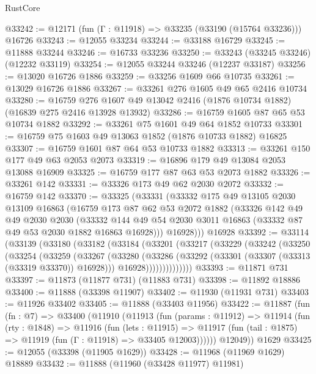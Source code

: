 \begin{lexlean}{RustCore}
\begin{coremodule}
@33242 := @12171 (fun (Γ : @11918) => @33235 (@33190 (@15764 @33236))) @16726
@33243 := @12055 @33234
@33244 := @33188 @16729
@33245 := @11888 @33244
@33246 := @16733 @33236
@33250 := @33243 (@33245 @33246) (@12232 @33119)
@33254 := @12055 @33244 @33246 (@12237 @33187)
@33256 := @13020 @16726 @1886
@33259 := @33256 @1609 @66 @10735
@33261 := @13029 @16726 @1886
@33267 := @33261 @276 @1605 @49 @65 @2416 @10734
@33280 := @16759 @276 @1607 @49 @13042 @2416 (@1876 @10734 @1882) (@16839 @275 @2416 @13928 @13932)
@33286 := @16759 @1605 @87 @65 @53 @10734 @1882
@33292 := @33261 @75 @1601 @49 @64 @1852 @10733
@33301 := @16759 @75 @1603 @49 @13063 @1852 (@1876 @10733 @1882) @16825
@33307 := @16759 @1601 @87 @64 @53 @10733 @1882
@33313 := @33261 @150 @177 @49 @63 @2053 @2073
@33319 := @16896 @179 @49 @13084 @2053 @13088 @16909
@33325 := @16759 @177 @87 @63 @53 @2073 @1882
@33326 := @33261 @142
@33331 := @33326 @173 @49 @62 @2030 @2072
@33332 := @16759 @142
@33370 := @33325
    (@33331
      (@33332
        @175
        @49
        @13105
        @2030
        @13109
        @16863
        (@16759
          @173
          @87
          @62
          @53
          @2072
          @1882
          (@33326
            @142
            @49
            @49
            @2030
            @2030
            (@33332 @144 @49 @54 @2030 @3011 @16863 (@33332 @87 @49 @53 @2030 @1882 @16863 @16928)))
          @16928)))
    @16928
@33392 := @33114
    (@33139
      (@33180
        (@33182
          (@33184
            (@33201
              (@33217
                (@33229
                  (@33242
                    (@33250
                      (@33254
                        (@33259
                          (@33267
                            (@33280
                              (@33286
                                (@33292 (@33301 (@33307 (@33313 (@33319 @33370)) @16928)))
                                @16928))))))))))))))
@33393 := @11871 @731
@33397 := @11873 (@11877 @731) (@11883 @731)
@33398 := @11892 @18886
@33400 := @11888 (@33398 @11907)
@33402 := @11930 (@11931 @731)
@33403 := @11926 @33402
@33405 := @11888 (@33403 @11956)
@33422 := @11887
    (fun (fn : @7) =>
    @33400
      (@11910
        (@11913
          (fun (params : @11912) =>
          @11914
            (fun (rty : @1848) =>
            @11916
              (fun (lets : @11915) =>
              @11917 (fun (tail : @1875) => @11919 (fun (Γ : @11918) => @33405 @12003))))))
        @12049))
    @1629
@33425 := @12055 (@33398 (@11905 @1629))
@33428 := @11968 (@11969 @1629) @18889
@33432 := @11888 (@11960 (@33428 @11977) @11981)

\end{coremodule}
\end{lexlean}
